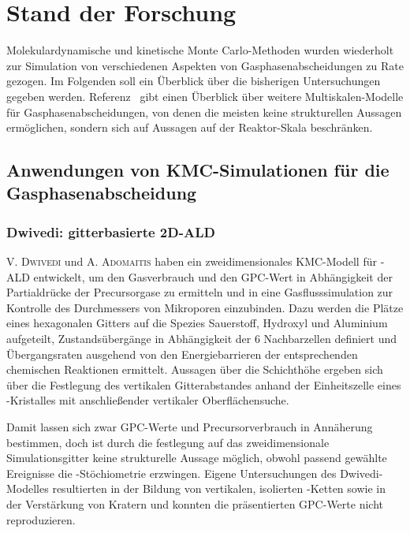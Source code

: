 \section{Stand der Forschung}
\label{present}

Molekulardynamische und kinetische Monte Carlo-Methoden wurden wiederholt zur Simulation von verschiedenen Aspekten von Gasphasenabscheidungen zu Rate gezogen.
Im Folgenden soll ein Überblick über die bisherigen Untersuchungen gegeben werden.
Referenz~\cite{dollet_multiscale_2004} gibt einen Überblick über weitere Multiskalen-Modelle für Gasphasenabscheidungen, von denen die meisten keine strukturellen Aussagen ermöglichen, sondern sich auf Aussagen auf der Reaktor-Skala beschränken.

\subsection{Anwendungen von KMC-Simulationen für die Gasphasenabscheidung}

\subsubsection{Dwivedi: gitterbasierte 2D-ALD}

\textsc{V. Dwivedi} und \textsc{A. Adomaitis} haben ein zweidimensionales KMC-Modell für -ALD entwickelt\cite{dwivedi_multiscale_2009,dwivedi_multiscale_2009-1,dwivedi_multiscale_2010}, um den Gasverbrauch und den GPC-Wert in Abhängigkeit der Partialdrücke der Precursorgase zu ermitteln und in eine Gasflusssimulation zur Kontrolle des Durchmessers von Mikroporen einzubinden.
Dazu werden die Plätze eines hexagonalen Gitters auf die Spezies Sauerstoff, Hydroxyl und Aluminium aufgeteilt, Zustandsübergänge in Abhängigkeit der 6 Nachbarzellen definiert und Übergangsraten ausgehend von den Energiebarrieren der entsprechenden chemischen Reaktionen ermittelt.
Aussagen über die Schichthöhe ergeben sich über die Festlegung des vertikalen Gitterabstandes anhand der Einheitszelle eines -Kristalles mit anschließender vertikaler Oberflächensuche.

Damit lassen sich zwar GPC-Werte und Precursorverbrauch in Annäherung bestimmen, doch ist durch die festlegung auf das zweidimensionale Simulationsgitter keine strukturelle Aussage möglich, obwohl passend gewählte Ereignisse die -Stöchiometrie erzwingen.
Eigene Untersuchungen des Dwivedi-Modelles resultierten in der Bildung von vertikalen, isolierten -Ketten sowie in der Verstärkung von Kratern und konnten die präsentierten GPC-Werte nicht reproduzieren.

